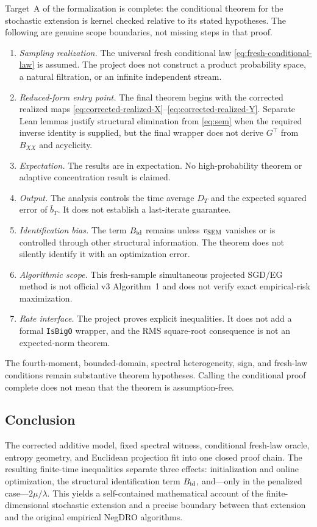 Target~A of the formalization is complete: the conditional theorem for the
stochastic extension is kernel checked relative to its stated hypotheses.
The following are genuine scope boundaries, not missing steps in that proof.
\begin{enumerate}[leftmargin=*]
  \item \emph{Sampling realization.}  The universal fresh conditional law
        \eqref{eq:fresh-conditional-law} is assumed.  The project does not
        construct a product probability space, a natural filtration, or an
        infinite independent stream.
  \item \emph{Reduced-form entry point.}  The final theorem begins with the
        corrected realized maps
        \eqref{eq:corrected-realized-X}--\eqref{eq:corrected-realized-Y}.
        Separate Lean lemmas justify structural elimination from
        \eqref{eq:sem} when the required inverse identity is supplied, but the
        final wrapper does not derive $G^\top$ from $B_{XX}$ and acyclicity.
  \item \emph{Expectation.}  The results are in expectation.  No
        high-probability theorem or adaptive concentration result is claimed.
  \item \emph{Output.}  The analysis controls the time average $D_T$ and the
        expected squared error of $\bar b_T$.  It does not establish a
        last-iterate guarantee.
  \item \emph{Identification bias.}  The term $B_{\rm id}$ remains unless
        $v_{\rm SEM}$ vanishes or is controlled through other structural
        information.  The theorem does not silently identify it with an
        optimization error.
  \item \emph{Algorithmic scope.}  This fresh-sample simultaneous projected
        SGD/EG method is not official v3 Algorithm~1 and does not verify exact
        empirical-risk maximization.
  \item \emph{Rate interface.}  The project proves explicit inequalities.  It
        does not add a formal \texttt{IsBigO} wrapper, and the RMS
        square-root consequence is not an expected-norm theorem.
\end{enumerate}

The fourth-moment, bounded-domain, spectral heterogeneity, sign, and
fresh-law conditions remain substantive theorem hypotheses.  Calling the
conditional proof complete does not mean that the theorem is assumption-free.

\subsection{Conclusion}

The corrected additive model, fixed spectral witness, conditional fresh-law
oracle, entropy geometry, and Euclidean projection fit into one closed proof
chain.  The resulting finite-time inequalities separate three effects:
initialization and online optimization, the structural identification term
$B_{\rm id}$, and---only in the penalized case---$2\mu/\lambda$.  This yields a
self-contained mathematical account of the finite-dimensional stochastic
extension and a precise boundary between that extension and the original
empirical NegDRO algorithms.

